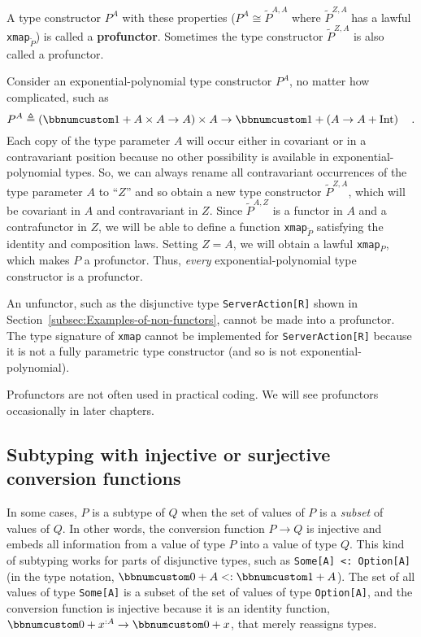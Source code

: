 A type constructor $P^{A}$ with these properties ($P^{A}\cong\tilde{P}^{A,A}$
where $\tilde{P}^{Z,A}$ has a lawful \lstinline!xmap!$_{\tilde{P}}$)
is called a \textbf{profunctor}. Sometimes
the type constructor $\tilde{P}^{Z,A}$ is also called a profunctor.

Consider an exponential-polynomial type constructor $P^{A}$, no matter
how complicated, such as
\[
P^{A}\triangleq\left(\bbnum 1+A\times A\rightarrow A\right)\times A\rightarrow\bbnum 1+\left(A\rightarrow A+\text{Int}\right)\quad.
\]
Each copy of the type parameter $A$ will occur either in covariant
or in a contravariant position because no other possibility is available
in exponential-polynomial types. So, we can always rename all contravariant
occurrences of the type parameter $A$ to \textsf{``}$Z$\textsf{''} and so obtain
a new type constructor $\tilde{P}^{Z,A}$, which will be covariant
in $A$ and contravariant in $Z$. Since $\tilde{P}^{A,Z}$ is a functor
in $A$ and a contrafunctor in $Z$, we will be able to define a function
\lstinline!xmap!$_{\tilde{P}}$ satisfying the identity and composition
laws. Setting $Z=A$, we will obtain a lawful \lstinline!xmap!$_{P}$,
which makes $P$ a profunctor. Thus, \emph{every} exponential-polynomial
type constructor is a profunctor.

An unfunctor, such as the disjunctive type \lstinline!ServerAction[R]!
shown in Section~\ref{subsec:Examples-of-non-functors}, cannot be
made into a profunctor. The type signature of \lstinline!xmap! cannot
be implemented for \lstinline!ServerAction[R]! because it is not
a fully parametric type constructor (and so is not exponential-polynomial).

Profunctors are not often used in practical coding. We will see profunctors
occasionally in later chapters.

\subsection{Subtyping with injective or surjective conversion functions}

In some cases, $P$ is a subtype of $Q$ when the set of values of
$P$ is a \emph{subset} of values of $Q$. In other words, the conversion
function $P\rightarrow Q$ is injective and embeds all information
from a value of type $P$ into a value of type $Q$. This kind of
subtyping works for parts of disjunctive types, such as \lstinline!Some[A] <: Option[A]!
(in the type notation, $\bbnum 0+A<:\bbnum 1+A$). The set of all
values of type \lstinline!Some[A]! is a subset of the set of values
of type \lstinline!Option[A]!, and the conversion function is injective
because it is an identity function, $\bbnum 0+x^{:A}\rightarrow\bbnum 0+x$,
that merely reassigns types.

